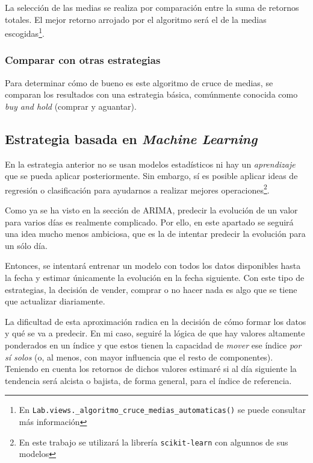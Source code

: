 La selección de las medias se realiza por comparación entre la suma de retornos totales. El mejor retorno arrojado por el algoritmo será el de la medias escogidas\footnote{En \texttt{Lab.views.\_algoritmo\_cruce\_medias\_automaticas()} se puede consultar más información}. 


\subsubsection{Comparar con otras estrategias}

Para determinar cómo de bueno es este algoritmo de cruce de medias, se comparan los resultados con una estrategia básica, comúnmente conocida como \emph{buy and hold} (comprar y aguantar)\citep{wiki:buy_and_hold}.


\subsection{Estrategia basada en \emph{Machine Learning}}

En la estrategia anterior no se usan modelos estadísticos ni hay un \emph{aprendizaje} que se pueda aplicar posteriormente. Sin embargo, sí es posible aplicar ideas de regresión o clasificación para ayudarnos a realizar mejores operaciones\footnote{En este trabajo se utilizará la librería \texttt{scikit-learn} con algunnos de sus modelos}. 

Como ya se ha visto en la sección de ARIMA, predecir la evolución de un valor para varios días es realmente complicado. Por ello, en este apartado se seguirá una idea mucho menos ambiciosa, que es la de intentar predecir la evolución para un sólo día. 

Entonces, se intentará entrenar un modelo con todos los datos disponibles hasta la fecha y estimar únicamente la evolución en la fecha siguiente. Con este tipo de estrategias, la decisión de vender, comprar o no hacer nada es algo que se tiene que actualizar diariamente.

La dificultad de esta aproximación radica en la decisión de cómo formar los datos y qué se va a predecir. En mi caso, seguiré la lógica de que hay valores altamente ponderados en un índice y que estos tienen la capacidad de \emph{mover} ese índice \emph{por sí solos} (o, al menos, con mayor influencia que el resto de componentes). Teniendo en cuenta los retornos de dichos valores estimaré si al día siguiente la tendencia será alcista o bajista, de forma general, para el índice de referencia. 

